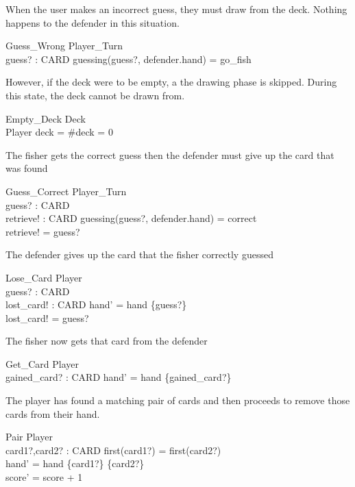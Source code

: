 \documentclass{article}
\begin{document}
When the user makes an incorrect guess, they must draw from
the deck. Nothing happens to the defender in this situation.
\begin{schema}{Guess\_Wrong}
    \Xi Player\_Turn \\
    guess? : CARD 
    \where
    guessing(guess?, defender.hand) = go\_fish
\end{schema}
 
However, if the deck were to be empty, a the drawing phase is skipped.
During this state, the deck cannot be drawn from.
\begin{schema}{Empty\_Deck}
    \Xi Deck \\
    \Xi Player
    \where
    deck = \emptyset \iff \#deck = 0
\end{schema}

The fisher gets the correct guess then the defender must
give up the card that was found
\begin{schema}{Guess\_Correct}
    \Xi Player\_Turn \\
    guess? : CARD \\
    retrieve! : CARD
    \where
    guessing(guess?, defender.hand) = correct\\
    retrieve! = guess?
\end{schema}

The defender gives up the card that the fisher correctly guessed
\begin{schema}{Lose\_Card}
    \Delta Player \\
    guess? : CARD \\
    lost\_card! : CARD
    \where
    hand' = hand \setminus \{guess?\} \\
    lost\_card! = guess?
\end{schema}

The fisher now gets that card from the defender
\begin{schema}{Get\_Card}
    \Delta Player \\
    gained\_card? : CARD
    \where
    hand' = hand \cup \{gained\_card?\}
\end{schema}

The player has found a matching pair of cards and then proceeds
to remove those cards from their hand.
\begin{schema}{Pair}
    \Delta Player \\
    card1?,card2? : CARD
    \where
    first(card1?) = first(card2?) \\
    hand' = hand \setminus \{card1?\} \cup \{card2?\} \\ 
    score' = score + 1
\end{schema}
\end{document}
